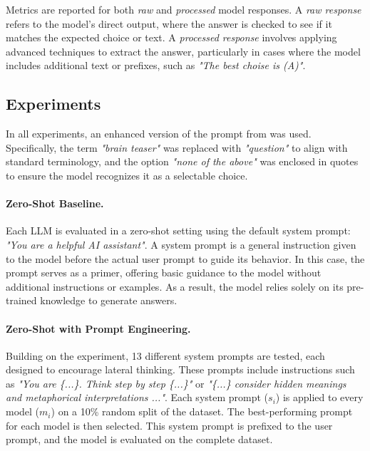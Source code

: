Metrics are reported for both \textit{raw} and \textit{processed} model responses. A \textit{raw response} refers to the model's direct output, where the answer is checked to see if it matches the expected choice or text. A \textit{processed response} involves applying advanced techniques to extract the answer, particularly in cases where the model includes additional text or prefixes, such as \textit{"The best choise is (A)"}.

\subsection{Experiments}

In all experiments, an enhanced version of the prompt from \textcite{jiangBRAINTEASERLateralThinking2023} was used. Specifically, the term \textit{"brain teaser"} was replaced with \textit{"question"} to align with standard terminology, and the option \textit{"none of the above"} was enclosed in quotes to ensure the model recognizes it as a selectable choice.

\paragraph{Zero-Shot Baseline.}
\label{sec:zero-shot-prompt}
Each \ac{LLM} is evaluated in a zero-shot setting using the default system prompt: \textit{"You are a helpful AI assistant"}. A system prompt is a general instruction given to the model before the actual user prompt to guide its behavior. In this case, the prompt serves as a primer, offering basic guidance to the model without additional instructions or examples. As a result, the model relies solely on its pre-trained knowledge to generate answers.

\paragraph{Zero-Shot with Prompt Engineering.}
\label{sec:zero-shot-prompt-engineering}
Building on the  experiment, 13 different system prompts are tested, each designed to encourage lateral thinking. These prompts include instructions such as \textit{"You are \{...\}. Think step by step \{...\}"} or \textit{"\{...\} consider hidden meanings and metaphorical interpretations {...}"}. Each system prompt ($s_i$) is applied to every model ($m_i$) on a 10\% random split of the dataset. The best-performing prompt for each model is then selected. This system prompt is prefixed to the user prompt, and the model is evaluated on the complete dataset.

